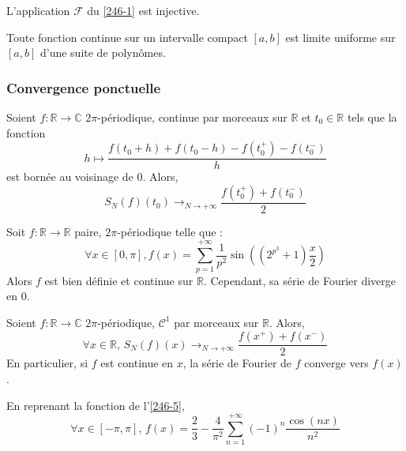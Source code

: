 
  \begin{application}
    L'application $\mathcal{F}$ du \cref{246-1} est injective.
  \end{application}


  \begin{application}
    Toute fonction continue sur un intervalle compact $[a,b]$ est limite uniforme sur $[a,b]$ d'une suite de polynômes.
  \end{application}

  \subsubsection{Convergence ponctuelle}


  \begin{theorem}
    Soient $f : \mathbb{R} \rightarrow \mathbb{C}$ $2\pi$-périodique, continue par morceaux sur $\mathbb{R}$ et $t_0 \in \mathbb{R}$ tels que la fonction
    \[ h \mapsto \frac{f(t_0 + h) + f(t_0 - h) - f(t_0^+) - f(t_0^-)}{h} \]
    est bornée au voisinage de $0$. Alors,
    \[ S_N(f)(t_0) \longrightarrow_{N \rightarrow +\infty} \frac{f(t_0^+) + f(t_0^-)}{2} \]
  \end{theorem}

  \begin{cexample}
    Soit $f : \mathbb{R} \rightarrow \mathbb{R}$ paire, $2\pi$-périodique telle que :
    \[ \forall x \in [0, \pi], f(x) = \sum_{p=1}^{+\infty} \frac{1}{p^2} \sin \left( (2^{p^3} + 1) \frac{x}{2} \right)
    \]
    Alors $f$ est bien définie et continue sur $\mathbb{R}$. Cependant, sa série de Fourier diverge en $0$.
  \end{cexample}

  \begin{corollary}
    Soient $f : \mathbb{R} \rightarrow \mathbb{C}$ $2\pi$-périodique, $\mathcal{C}^1$ par morceaux sur $\mathbb{R}$. Alors,
    \[ \forall x \in \mathbb{R}, \, S_N(f)(x) \longrightarrow_{N \rightarrow +\infty} \frac{f(x^+) + f(x^-)}{2} \]
    En particulier, si $f$ est continue en $x$, la série de Fourier de $f$ converge vers $f(x)$.
  \end{corollary}

  \begin{example}
    \label{246-6}
    En reprenant la fonction de l'\cref{246-5},
    \[ \forall x \in [-\pi, \pi], \, f(x) = \frac{2}{3} - \frac{4}{\pi^2} \sum_{n=1}^{+\infty} (-1)^n \frac{\cos(nx)}{n^2} \]
  \end{example}

